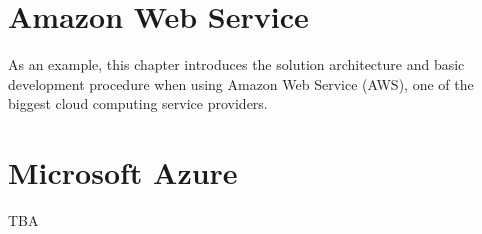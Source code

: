 \chapter{Amazon Web Service}

As an example, this chapter introduces the solution architecture and basic development procedure when using Amazon Web Service (AWS), one of the biggest cloud computing service providers.



\chapter{Microsoft Azure}

TBA